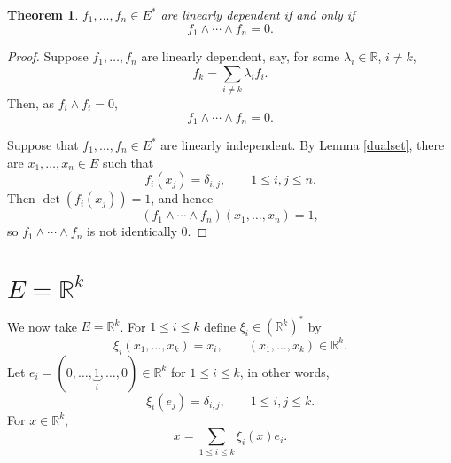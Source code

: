 \documentclass{amsart}
\newtheorem{theorem}{Theorem}
\theoremstyle{definition}
\begin{document}
\begin{theorem}
$f_1,\ldots,f_n \in E^*$ are linearly dependent if and only if 
\[
f_1 \wedge \cdots \wedge f_n=0.
\]
\end{theorem}
\begin{proof}
Suppose $f_1,\ldots,f_n$ are linearly dependent, say, for some
$\lambda_i \in \mathbb{R}$, $i \neq k$,
\[
f_k = \sum_{i \neq k} \lambda_i f_i.
\]
Then, as $f_i \wedge f_i =0$,
\[
f_1 \wedge \cdots \wedge f_n = 0.
\]

Suppose
that $f_1,\ldots,f_n \in E^*$ are linearly independent. 
By Lemma \ref{dualset},
there are $x_1,\ldots,x_n \in E$ such that 
\[
f_i(x_j) = \delta_{i,j},\qquad 1 \leq i, j \leq n.
\]
Then $\det (f_i(x_j)) = 1$, and hence 
\[
(f_1 \wedge \cdots \wedge f_n)(x_1,\ldots,x_n) = 1,
\]
so $f_1 \wedge \cdots \wedge f_n$ is not identically $0$.
\end{proof}





\section{$E=\mathbb{R}^k$}
We now take $E=\mathbb{R}^k$.
For $1 \leq i \leq k$ define $\xi_i \in (\mathbb{R}^k)^*$ by
\[
\xi_i(x_1,\ldots,x_k) = x_i,\qquad (x_1,\ldots,x_k) \in \mathbb{R}^k.
\]
Let $e_i = (0,\ldots,\underbrace{1}_i,\ldots,0) \in \mathbb{R}^k$ for $1 \leq i \leq k$, in other words,
\[
\xi_i(e_j) = \delta_{i,j},\qquad 1 \leq i,j \leq k.
\]  
For $x \in \mathbb{R}^k$,
\[
x = \sum_{1 \leq i \leq k} \xi_i(x)e_i.
\]
\end{document}
